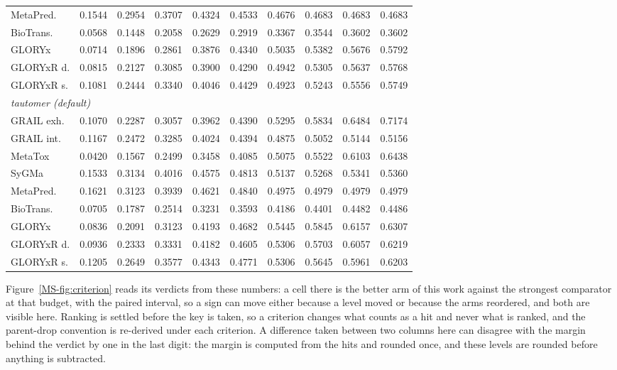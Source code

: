 \begin{table}[t]
\begin{threeparttable}
\begin{tabular}{lrrrrrrrrr}
\quad MetaPred. & 0.1544 & 0.2954 & 0.3707 & 0.4324 & 0.4533 & 0.4676 & 0.4683 & 0.4683 & 0.4683 \\
\quad BioTrans. & 0.0568 & 0.1448 & 0.2058 & 0.2629 & 0.2919 & 0.3367 & 0.3544 & 0.3602 & 0.3602 \\
\quad GLORYx & 0.0714 & 0.1896 & 0.2861 & 0.3876 & 0.4340 & 0.5035 & 0.5382 & 0.5676 & 0.5792 \\
\quad GLORYxR d. & 0.0815 & 0.2127 & 0.3085 & 0.3900 & 0.4290 & 0.4942 & 0.5305 & 0.5637 & 0.5768 \\
\quad GLORYxR s. & 0.1081 & 0.2444 & 0.3340 & 0.4046 & 0.4429 & 0.4923 & 0.5243 & 0.5556 & 0.5749 \\
\midrule
\multicolumn{10}{l}{\emph{tautomer (default)}} \\
\quad GRAIL exh. & 0.1070 & 0.2287 & 0.3057 & 0.3962 & 0.4390 & 0.5295 & 0.5834 & 0.6484 & 0.7174 \\
\quad GRAIL int. & 0.1167 & 0.2472 & 0.3285 & 0.4024 & 0.4394 & 0.4875 & 0.5052 & 0.5144 & 0.5156 \\
\quad MetaTox & 0.0420 & 0.1567 & 0.2499 & 0.3458 & 0.4085 & 0.5075 & 0.5522 & 0.6103 & 0.6438 \\
\quad SyGMa & 0.1533 & 0.3134 & 0.4016 & 0.4575 & 0.4813 & 0.5137 & 0.5268 & 0.5341 & 0.5360 \\
\quad MetaPred. & 0.1621 & 0.3123 & 0.3939 & 0.4621 & 0.4840 & 0.4975 & 0.4979 & 0.4979 & 0.4979 \\
\quad BioTrans. & 0.0705 & 0.1787 & 0.2514 & 0.3231 & 0.3593 & 0.4186 & 0.4401 & 0.4482 & 0.4486 \\
\quad GLORYx & 0.0836 & 0.2091 & 0.3123 & 0.4193 & 0.4682 & 0.5445 & 0.5845 & 0.6157 & 0.6307 \\
\quad GLORYxR d. & 0.0936 & 0.2333 & 0.3331 & 0.4182 & 0.4605 & 0.5306 & 0.5703 & 0.6057 & 0.6219 \\
\quad GLORYxR s. & 0.1205 & 0.2649 & 0.3577 & 0.4343 & 0.4771 & 0.5306 & 0.5645 & 0.5961 & 0.6203 \\
\bottomrule
\end{tabular}
\begin{tablenotes}[flushleft]\footnotesize
\item Figure~\ref{MS-fig:criterion} reads its verdicts from these numbers: a cell there is the better arm of this work against the strongest comparator at that budget, with the paired interval, so a sign can move either because a level moved or because the arms reordered, and both are visible here. Ranking is settled before the key is taken, so a criterion changes what counts as a hit and never what is ranked, and the parent-drop convention is re-derived under each criterion. A difference taken between two columns here can disagree with the margin behind the verdict by one in the last digit: the margin is computed from the hits and rounded once, and these levels are rounded before anything is subtracted.
\end{tablenotes}
\end{threeparttable}
\end{table}
